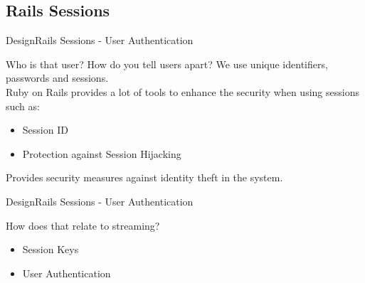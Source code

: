 \subsection{Rails Sessions}
\begin{frame}{Design}{Rails Sessions - User Authentication}
  \begin{block}{Who is that user?}
  	How do you tell users apart? We use unique identifiers, passwords and sessions. \\

  	Ruby on Rails provides a lot of tools to enhance the security when using sessions such as: \\
  	\begin{itemize}
  		\item Session ID
  		\item Protection against Session Hijacking
  	\end{itemize}

  	Provides security measures against identity theft in the system.
  \end{block}
\end{frame}

\begin{frame}{Design}{Rails Sessions - User Authentication}
  \begin{block}{How does that relate to streaming?}
  	\begin{itemize}
  		\item Session Keys
  		\item User Authentication
  	\end{itemize}
  \end{block}
\end{frame}


%

